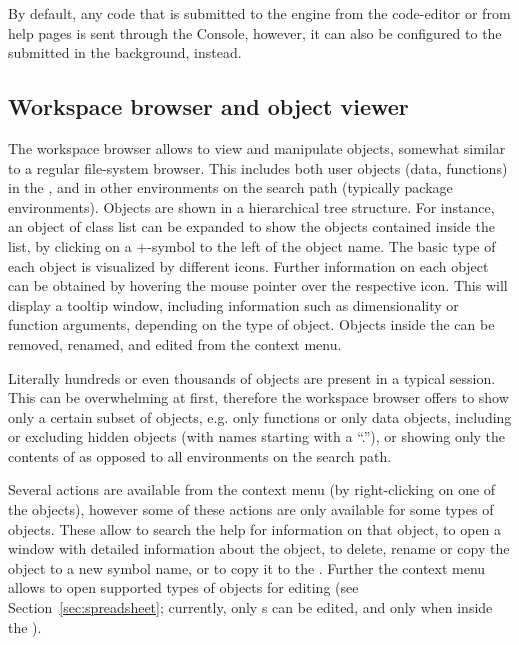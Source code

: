 By default, any code that is submitted to the
 engine from the code-editor or from help
pages is sent through the  Console,
however, it can also be configured to the submitted in the background,
instead.

\subsection{Workspace browser and object viewer}
\label{sec:workspace_browser_object_viewer}

The workspace browser allows to view
and manipulate  objects, somewhat similar
to a regular file-system browser. This includes both user objects
(data, functions) in the , and in other environments on the
 search path (typically
 package environments). Objects are shown
in a hierarchical tree structure. For instance, an object of class
list can be expanded to show the objects
contained inside the list, by clicking on a
+-symbol to the left of the object name.
The basic type of each object is visualized by different icons. Further
information on each object can be obtained by hovering the mouse
pointer over the respective icon. This will display a tooltip window,
including information such as dimensionality or function arguments,
depending on the type of object. Objects inside the  can be
removed, renamed, and edited from the context menu.

Literally hundreds or even thousands of objects are present in a typical
 session. This can be overwhelming at
first, therefore the workspace browser offers to show only a certain
subset of objects, e.g. only functions or only data objects, including
or excluding hidden objects (with names
starting with a 
``.''), or showing only the contents of  as
opposed to all environments on the search path.

Several actions are available from the context menu (by right-clicking
on one of the objects), however some of these actions are only
available for some types of objects. These allow to search the
 help for information on that object, to
open a window with detailed information about the object, to delete, rename or copy the object to a new symbol name, or to
copy it to the . Further the context menu allows to open
supported types of objects for editing (see Section~\ref{sec:spreadsheet}; currently, only
s can be edited, and only when inside the ). 

